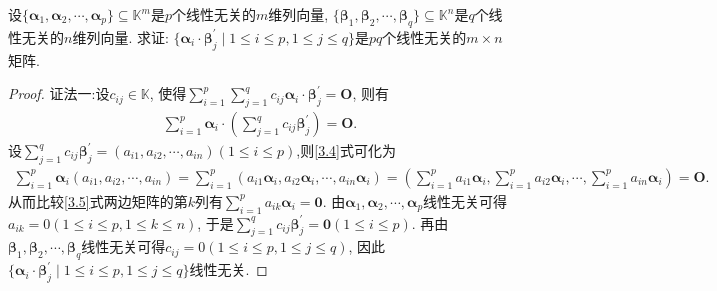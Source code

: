 \documentclass[../../main.tex]{subfiles}
\begin{document}
\begin{proposition}\label{proposition:线性无关的向量组与另一个转置的乘积积生成的矩阵也线性无关}
设\(\{\boldsymbol{\alpha}_{1},\boldsymbol{\alpha}_{2},\cdots,\boldsymbol{\alpha}_{p}\}\subseteq\mathbb{K}^{m}\)是\(p\)个线性无关的\(m\)维列向量, \(\{\boldsymbol{\beta}_{1},\boldsymbol{\beta}_{2},\cdots,\boldsymbol{\beta}_{q}\}\subseteq\mathbb{K}^{n}\)是\(q\)个线性无关的\(n\)维列向量. 求证: \(\{\boldsymbol{\alpha}_{i}\cdot\boldsymbol{\beta}_{j}^{\prime}\mid1\leqslant  i\leqslant  p,1\leqslant  j\leqslant  q\}\)是\(pq\)个线性无关的\(m\times n\)矩阵.
\end{proposition}
\begin{proof}
{\color{blue}证法一:}设\(c_{ij}\in\mathbb{K}\), 使得\(\sum_{i = 1}^{p}\sum_{j = 1}^{q}c_{ij}\boldsymbol{\alpha}_{i}\cdot\boldsymbol{\beta}_{j}^{\prime}=\boldsymbol{O}\), 则有
\begin{align}
\sum_{i = 1}^{p}\boldsymbol{\alpha}_{i}\cdot\left(\sum_{j = 1}^{q}c_{ij}\boldsymbol{\beta}_{j}^{\prime}\right)=\boldsymbol{O}.\label{3.4}
\end{align}
设\(\sum_{j = 1}^{q}c_{ij}\boldsymbol{\beta}_{j}^{\prime}=(a_{i1},a_{i2},\cdots,a_{in})(1\leqslant  i\leqslant  p)\),则\eqref{3.4}式可化为
\begin{align}\label{3.5}
\sum_{i=1}^p{\boldsymbol{\alpha }_i\left( a_{i1},a_{i2},\cdots ,a_{in} \right)}=\sum_{i=1}^p{\left( a_{i1}\boldsymbol{\alpha }_i,a_{i2}\boldsymbol{\alpha }_i,\cdots ,a_{in}\boldsymbol{\alpha }_i \right)}=\left( \sum_{i=1}^p{a_{i1}\boldsymbol{\alpha }_i},\sum_{i=1}^p{a_{i2}\boldsymbol{\alpha }_i},\cdots ,\sum_{i=1}^p{a_{in}\boldsymbol{\alpha }_i} \right) =\boldsymbol{O}.
\end{align}
从而比较\eqref{3.5}式两边矩阵的第\(k\)列有\(\sum_{i = 1}^{p}a_{ik}\boldsymbol{\alpha}_{i}=\boldsymbol{0}\). 由\(\boldsymbol{\alpha}_{1},\boldsymbol{\alpha}_{2},\cdots,\boldsymbol{\alpha}_{p}\)线性无关可得\(a_{ik}=0(1\leqslant  i\leqslant  p,1\leqslant  k\leqslant  n)\), 于是\(\sum_{j = 1}^{q}c_{ij}\boldsymbol{\beta}_{j}^{\prime}=\boldsymbol{0}(1\leqslant  i\leqslant  p)\). 再由\(\boldsymbol{\beta}_{1},\boldsymbol{\beta}_{2},\cdots,\boldsymbol{\beta}_{q}\)线性无关可得\(c_{ij}=0(1\leqslant  i\leqslant  p,1\leqslant  j\leqslant  q)\), 因此\(\{\boldsymbol{\alpha}_{i}\cdot\boldsymbol{\beta}_{j}^{\prime}\mid1\leqslant  i\leqslant  p,1\leqslant  j\leqslant  q\}\)线性无关. 


\end{proof}
\end{document}
